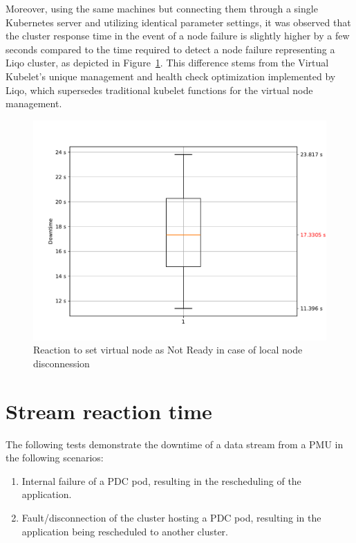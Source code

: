 Moreover, using the same machines but connecting them through a single Kubernetes server and utilizing identical parameter settings, it was observed that the cluster response time in the event of a node failure is slightly higher by a few seconds compared to the time required to detect a node failure representing a Liqo cluster, as depicted in Figure~\ref{graph:k-reaction2}. This difference stems from the Virtual Kubelet's unique management and health check optimization implemented by Liqo, which supersedes traditional kubelet functions for the virtual node management.

\begin{figure}[ht]\centering
\includegraphics[scale=0.5]{Pictures/k3s-reaction2}
\caption{Reaction to set virtual node as Not Ready in case of local node disconnession}\label{graph:k-reaction2}
\end{figure}

\section{Stream reaction time}
The following tests demonstrate the downtime of a data stream from a PMU in the following scenarios:

\begin{enumerate}
\item Internal failure of a PDC pod, resulting in the rescheduling of the application. 
\item Fault/disconnection of the cluster hosting a PDC pod, resulting in the application being rescheduled to another cluster.
\end{enumerate}

